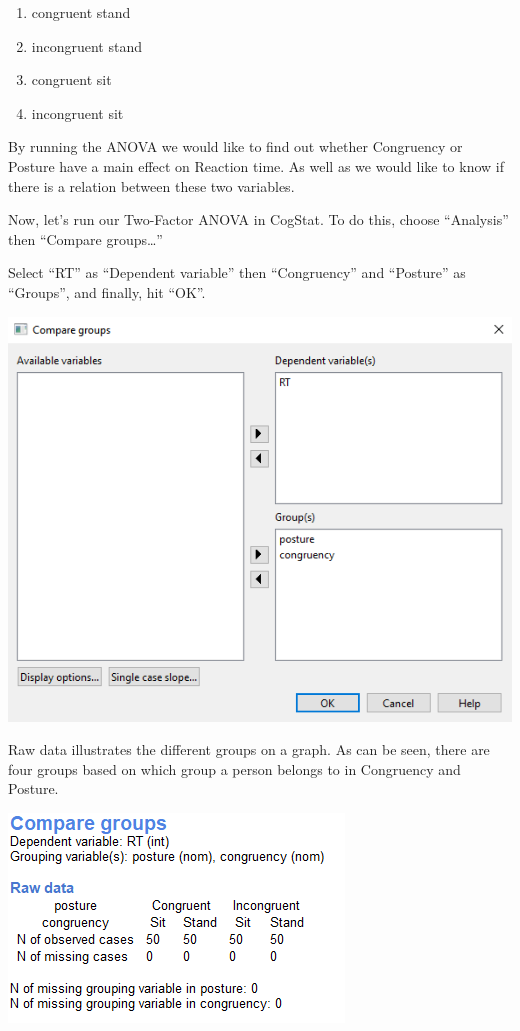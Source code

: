 \documentclass[
]{book}
\begin{document}
\begin{enumerate}
\def\labelenumi{\arabic{enumi}.}
\item
  congruent stand
\item
  incongruent stand
\item
  congruent sit
\item
  incongruent sit
\end{enumerate}

By running the ANOVA we would like to find out whether Congruency or Posture have a main effect on Reaction time. As well as we would like to know if there is a relation between these two variables.

Now, let's run our Two-Factor ANOVA in CogStat. To do this, choose ``Analysis'' then ``Compare groups\ldots{}''

Select ``RT'' as ``Dependent variable'' then ``Congruency'' and ``Posture'' as ``Groups'', and finally, hit ``OK''.

\includegraphics{img/ch10/10.3comparegroups_window.png}

Raw data illustrates the different groups on a graph. As can be seen, there are four groups based on which group a person belongs to in Congruency and Posture.

\includegraphics{img/ch10/10.3comparegroups_raw.png}
\end{document}
